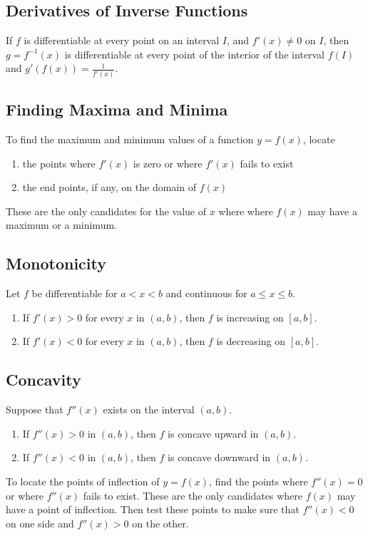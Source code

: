 \documentclass{artikel3}
\begin{document}
\subsection{Derivatives of Inverse Functions}\label{dinv}
If $f$ is differentiable at every point on an interval $I$, and $f'(x)\neq 0$
on $I$, then $g=f^{-1}(x)$ is differentiable at every point of the interior of
the interval $f(I)$ and $g'(f(x))=\frac{1}{f'(x)}$.

\subsection{Finding Maxima and Minima}
To find the maximum and minimum values of a function $y=f(x)$, locate
\begin{enumerate}
\item{the points where $f'(x)$ is zero or where $f'(x)$ fails to exist}
\item{the end points, if any, on the domain of $f(x)$}
\end{enumerate}
These are the only candidates for the value of $x$ where where $f(x)$ 
may have a maximum or a minimum.

\subsection{Monotonicity}
Let $f$ be differentiable for $a<x<b$ and continuous for $a\leq x\leq b$.
\begin{enumerate}
\item{If $f'(x)>0$ for every $x$ in $(a,b)$, then $f$ is increasing on $[a,b]$.}
\item{If $f'(x)<0$ for every $x$ in $(a,b)$, then $f$ is decreasing on $[a,b]$.}
\end{enumerate}

\subsection{Concavity}
Suppose that $f''(x)$ exists on the interval $(a,b)$.
\begin{enumerate}
\item{If $f''(x)>0$ in $(a,b)$, then $f$ is concave upward in $(a,b)$.}
\item{If $f''(x)<0$ in $(a,b)$, then $f$ is concave downward in $(a,b)$.}
\end{enumerate}
To locate the points of inflection of $y=f(x)$, find the points where 
$f''(x)=0$ or where $f''(x)$ fails to exist. These are the only candidates where 
$f(x)$ may have a point of inflection. Then test these points to make sure that 
$f''(x)<0$ on one side and $f''(x)>0$ on the other.
\end{document}
